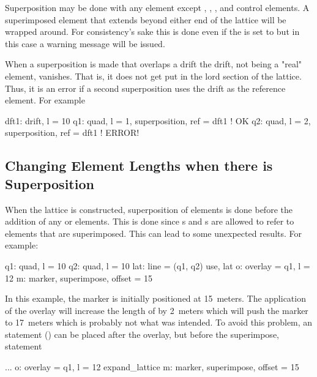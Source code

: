 Superposition may be done with any element except ,
, , and  control elements. A superimposed element that
extends beyond either end of the lattice will be wrapped around. For consistency's sake
this is done even if the  is set to  but in this case
a warning message will be issued.

When a superposition is made that overlaps a drift the drift, not being a "real" 
element, vanishes. That is, it does not get put in the lord section of the lattice.
Thus, it is an error if a second superposition uses the drift as the reference element.
For example
\begin{example}
  dft1: drift, l = 10
  q1: quad, l = 1, superposition, ref = dft1   ! OK 
  q2: quad, l = 2, superposition, ref = dft1   ! ERROR! 
\end{example}

\subsection{Changing Element Lengths when there is Superposition}
\label{s:super.length}

When the lattice is constructed, superposition of elements is done
before the addition of any  or  elements. This
is done since s and s are allowed to refer
to elements that are superimposed. This can lead to some unexpected
results. For example:
\begin{example}
  q1: quad, l = 10
  q2: quad, l = 10
  lat: line = (q1, q2)
  use, lat
  o: overlay = {q1}, l = 12
  m: marker, superimpose, offset = 15
\end{example} 
In this example, the marker is initially positioned at 15~meters.
The application of the overlay will increase the length of  by
2~meters which will push the marker  to 17~meters which is probably 
not what was intended. To avoid this problem, an  statement
() can be placed after the overlay, but before the
superimpose, statement
\begin{example}
  ...
  o: overlay = {q1}, l = 12
  expand_lattice
  m: marker, superimpose, offset = 15
\end{example} 

